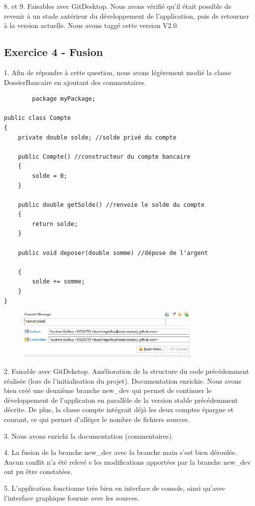\documentclass{article}
\begin{document}
8. et 9.
Faisables avec GitDesktop. Nous avons vérifié qu'il était possible de revenir à un stade antérieur du développement de l'application, puis de retourner à la version actuelle. Nous avons taggé cette version V2.0.

\subsection{Exercice 4 - Fusion}

1.
Afin de répondre à cette question, nous avons légèrement modié la classe DossierBancaire en ajoutant des commentaires.
\begin{lstlisting}
        package myPackage;

public class Compte
{
	private double solde; //solde privé du compte
	
	public Compte() //constructeur du compte bancaire
	{
		solde = 0;
	}
	
	public double getSolde() //renvoie le solde du compte
	{
		return solde;
	}
	
	public void deposer(double somme) //dépose de l'argent
   
	{
		solde += somme;
	}
}
\end{lstlisting}
\begin{figure}[h]
\includegraphics[width=0.8\textwidth]{commit.png}
\end{figure}
2.
Faisable avec GitDekstop. Amélioration de la structure du code précédemment réalisée (lors de l'initialisation du projet). Documentation enrichie. Nous avons bien créé une deuxième branche new_dev qui permet de continuer le développement de l'applicaton en parallèle de la version stable précédemment décrite. De plus, la classe compte intégrait déjà les deux comptes épargne et courant, ce qui permet d'alléger le nombre de fichiers sources.

3.
Nous avons enrichi la documentation (commentaires).

4.
La fusion de la branche new_dev avec la branche main s'est bien déroulée. Aucun conflit n'a été relevé e les modifications apportées par la branche new_dev ont pu être constatées.

5.
L'application fonctionne très bien en interface de console, ainsi qu'avec l'interface graphique fournie avec les sources.
\end{document}
